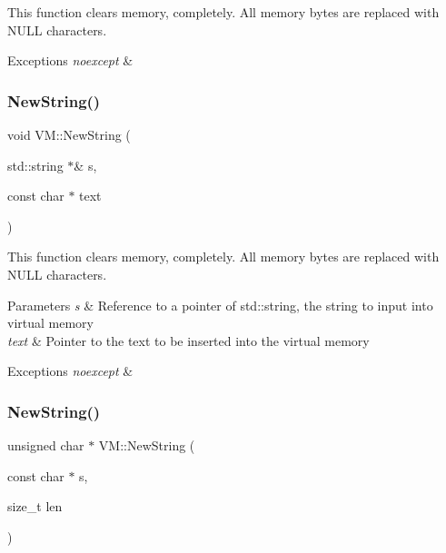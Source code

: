 This function clears memory, completely. All memory bytes are replaced with N\+U\+LL characters. 
\begin{DoxyExceptions}{Exceptions}
{\em noexcept} & \\
\hline
\end{DoxyExceptions}
\mbox{\label{class_v_m_a96ac4af79fb5e5fa9c168ffe0bd8a8a7}} 
\subsubsection{\texorpdfstring{NewString()}{NewString()}\hspace{0.1cm}{\footnotesize\ttfamily [1/2]}}
{\footnotesize\ttfamily void V\+M\+::\+New\+String (\begin{DoxyParamCaption}\item[{std\+::string $\ast$\&}]{s,  }\item[{const char $\ast$}]{text }\end{DoxyParamCaption})}

This function clears memory, completely. All memory bytes are replaced with N\+U\+LL characters. 
\begin{DoxyParams}{Parameters}
{\em s} & Reference to a pointer of std\+::string, the string to input into virtual memory \\
\hline
{\em text} & Pointer to the text to be inserted into the virtual memory \\
\hline
\end{DoxyParams}

\begin{DoxyExceptions}{Exceptions}
{\em noexcept} & \\
\hline
\end{DoxyExceptions}
\mbox{\label{class_v_m_ae9bb9435ff87b17b9a2103a4fbaa526f}} 
\subsubsection{\texorpdfstring{NewString()}{NewString()}\hspace{0.1cm}{\footnotesize\ttfamily [2/2]}}
{\footnotesize\ttfamily unsigned char $\ast$ V\+M\+::\+New\+String (\begin{DoxyParamCaption}\item[{const char $\ast$}]{s,  }\item[{size\+\_\+t}]{len }\end{DoxyParamCaption})}

